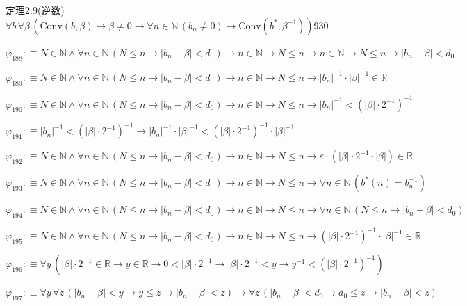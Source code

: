\begin{fullproof}{定理2.9(逆数)}{$\forall b\,\forall \beta\,(\mathrm{Conv}(b,\beta) \to \beta \neq 0 \to \forall n \in \mathbb{N}\,(b_{n} \neq 0) \to \mathrm{Conv}(b^{\ast},\beta^{-1}))$}{930}
\begin{abbrevlist}
\item $\varphi_{188} :\equiv N \in \mathbb{N} \land \forall n \in \mathbb{N}\,(N \leq n \to \lvert b_{n} - \beta \rvert < d_{0}) \to n \in \mathbb{N} \to N \leq n \to n \in \mathbb{N} \to N \leq n \to \lvert b_{n} - \beta \rvert < d_{0}$
\item $\varphi_{189} :\equiv N \in \mathbb{N} \land \forall n \in \mathbb{N}\,(N \leq n \to \lvert b_{n} - \beta \rvert < d_{0}) \to n \in \mathbb{N} \to N \leq n \to \lvert b_{n} \rvert^{-1} \cdot \lvert \beta \rvert^{-1} \in \mathbb{R}$
\item $\varphi_{190} :\equiv N \in \mathbb{N} \land \forall n \in \mathbb{N}\,(N \leq n \to \lvert b_{n} - \beta \rvert < d_{0}) \to n \in \mathbb{N} \to N \leq n \to \lvert b_{n} \rvert^{-1} < (\lvert \beta \rvert \cdot 2^{-1})^{-1}$
\item $\varphi_{191} :\equiv \lvert b_{n} \rvert^{-1} < (\lvert \beta \rvert \cdot 2^{-1})^{-1} \to \lvert b_{n} \rvert^{-1} \cdot \lvert \beta \rvert^{-1} < (\lvert \beta \rvert \cdot 2^{-1})^{-1} \cdot \lvert \beta \rvert^{-1}$
\item $\varphi_{192} :\equiv N \in \mathbb{N} \land \forall n \in \mathbb{N}\,(N \leq n \to \lvert b_{n} - \beta \rvert < d_{0}) \to n \in \mathbb{N} \to N \leq n \to \varepsilon \cdot (\lvert \beta \rvert \cdot 2^{-1} \cdot \lvert \beta \rvert) \in \mathbb{R}$
\item $\varphi_{193} :\equiv N \in \mathbb{N} \land \forall n \in \mathbb{N}\,(N \leq n \to \lvert b_{n} - \beta \rvert < d_{0}) \to n \in \mathbb{N} \to N \leq n \to \forall n \in \mathbb{N}\,(b^{\ast}(n) = b_{n}^{-1})$
\item $\varphi_{194} :\equiv N \in \mathbb{N} \land \forall n \in \mathbb{N}\,(N \leq n \to \lvert b_{n} - \beta \rvert < d_{0}) \to n \in \mathbb{N} \to N \leq n \to \forall n \in \mathbb{N}\,(N \leq n \to \lvert b_{n} - \beta \rvert < d_{0})$
\item $\varphi_{195} :\equiv N \in \mathbb{N} \land \forall n \in \mathbb{N}\,(N \leq n \to \lvert b_{n} - \beta \rvert < d_{0}) \to n \in \mathbb{N} \to N \leq n \to (\lvert \beta \rvert \cdot 2^{-1})^{-1} \cdot \lvert \beta \rvert^{-1} \in \mathbb{R}$
\item $\varphi_{196} :\equiv \forall y\,(\lvert \beta \rvert \cdot 2^{-1} \in \mathbb{R} \to y \in \mathbb{R} \to 0 < \lvert \beta \rvert \cdot 2^{-1} \to \lvert \beta \rvert \cdot 2^{-1} < y \to y^{-1} < (\lvert \beta \rvert \cdot 2^{-1})^{-1})$
\item $\varphi_{197} :\equiv \forall y\,\forall z\,(\lvert b_{n} - \beta \rvert < y \to y \leq z \to \lvert b_{n} - \beta \rvert < z) \to \forall z\,(\lvert b_{n} - \beta \rvert < d_{0} \to d_{0} \leq z \to \lvert b_{n} - \beta \rvert < z)$

\end{abbrevlist}
\end{fullproof}
